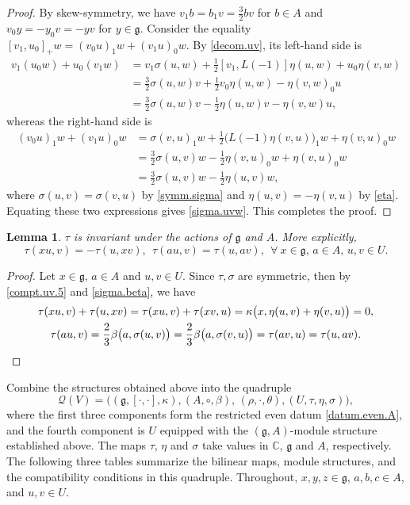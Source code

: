 \documentclass[12pt]{article}
\numberwithin{equation}{section}
\newtheorem{lemma}[theorem]{Lemma}
\theoremstyle{definition}
\theoremstyle{plain}
\newcommand{\bC}{\ensuremath{\mathbb{C}}}
\newcommand{\fg}{\mathfrak{g}}
\newcommand{\cQ}{\ensuremath{\mathcal{Q}}}
\begin{document}
\begin{proof}
By skew-symmetry, we have $v_1b=b_1v=\frac32bv$ for $b\in A$ and $v_0y=-y_0v=-yv$ for $y\in\fg$. Consider the equality $[v_1,u_0]_+w=(v_0u)_1w+(v_1u)_0w$. By \eqref{decom.uv}, its left-hand side is
\begin{align*}
    v_1(u_0w)+u_0(v_1w)&=v_1\sigma(u,w)+\frac{1}{2}[v_1,L(-1)]\eta(u,w)+u_0\eta(v,w)\\
    &=\frac{3}{2}\sigma(u,w)v+\frac{1}{2}v_0\eta(u,w)-\eta(v,w)_0u\\
    &=\frac32\sigma(u,w)v-\frac12\eta(u,w)v-\eta(v,w)u,
\end{align*}
whereas the right-hand side is
\begin{align*}
    (v_0u)_1w+(v_1u)_0w&=\sigma(v,u)_1w+\frac{1}{2}\big(L(-1)\eta(v,u)\big)_1w+\eta(v,u)_0w\\
    &=\frac{3}{2}\sigma(u,v)w-\frac{1}{2}\eta(v,u)_0w+\eta(v,u)_0w\\
    &=\frac32\sigma(u,v)w-\frac12\eta(u,v)w,
\end{align*}
where $\sigma(u,v)=\sigma(v,u)$ by \eqref{symm.sigma} and $\eta(u,v)=-\eta(v,u)$ by \eqref{eta}. Equating these two expressions gives \eqref{sigma.uvw}. This completes the proof.
\end{proof}


\begin{lemma}\label{lem:tau.invar}
    $\tau$ is invariant under the actions of $\fg$ and $A$. More explicitly,
    \begin{equation*}
        \tau(xu,v)=-\tau(u,xv),\ \ \tau(au,v)=\tau(u,av),\ \ \forall\ x\in\fg,\,a\in A,\,u,v\in U.
    \end{equation*}
\end{lemma}
\begin{proof}
    Let $x\in\fg$, $a\in A$ and $u,v\in U$. Since $\tau,\sigma$ are symmetric, then by \eqref{compt.uv.5} and \eqref{sigma.beta}, we have
    \begin{gather*}
        \tau(xu,v)+\tau(u,xv)=\tau(xu,v)+\tau(xv,u)=\kappa\big(x,\eta(u,v)+\eta(v,u)\big)=0,\\
        \tau(au,v)=\frac{2}{3}\beta\big(a,\sigma(u,v)\big)=\frac{2}{3}\beta\big(a,\sigma(v,u)\big)=\tau(av,u)=\tau(u,av). \qedhere
    \end{gather*}
\end{proof}

Combine the structures obtained above into the quadruple
\begin{equation}\label{quadruple}
    \cQ(V)=\Big((\fg,[\cdot,\cdot],\kappa),(A,\circ,\beta),\,(\rho,\cdot,\theta),(U,\tau,\eta,\sigma)\Big),
\end{equation}
where the first three components form the restricted even datum \eqref{datum.even.A}, and the fourth component is $U$ equipped with the $(\fg,A)$-module structure established above. The maps $\tau$, $\eta$ and $\sigma$ take values in $\bC$, $\fg$ and $A$, respectively. The following three tables summarize the bilinear maps,  module structures, and the compatibility conditions in this quadruple. Throughout, $x,y,z\in\fg$, $a,b,c\in A$, and $u,v\in U$.
\end{document}
